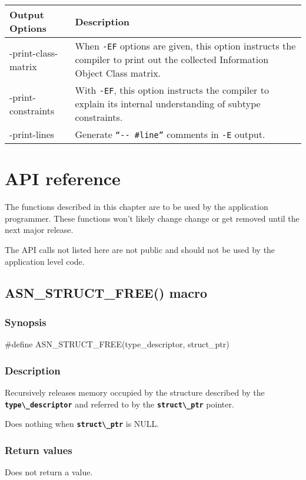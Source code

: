 \documentclass[english,oneside,12pt]{book}
\newcommand{\apisection}[2]{\clearpage\section{\label{#1}#2}}
\newcommand{\code}[1]{\texttt{\textbf{\lstinline{#1}}}}
\begin{document}
\begin{longtable}{lp{4in}}
\textbf{Output Options} & \textbf{Description}\\
\midrule
{\ttfamily -print-class-matrix} & {\small When \texttt{-EF} options are given, this option instructs the compiler to print out the collected Information Object Class matrix.}\\
{\ttfamily -print-constraints} & {\small With \texttt{-EF}, this option instructs the compiler
to explain its internal understanding of subtype constraints.}\\
{\ttfamily -print-lines} & {\small Generate \texttt{``-{}- \#line''} comments
in \texttt{-E} output.}\\
\end{longtable}
\renewcommand{\arraystretch}{1}


\chapter{API reference}

The functions described in this chapter are to be used by the application
programmer. These functions won't likely change change or get removed until
the next major release.

The API calls not listed here are not public and should not be used by the
application level code.

\apisection{sec:ASN_STRUCT_FREE}{ASN\_STRUCT\_FREE() macro}

\subsection*{Synopsis}

\begin{signature}
#define ASN_STRUCT_FREE(type_descriptor, struct_ptr)
\end{signature}

\subsection*{Description}

Recursively releases memory occupied by the structure
described by the \code{type\_descriptor} and referred to
by the \code{struct\_ptr} pointer.

Does nothing when \code{struct\_ptr} is NULL.

\subsection*{Return values}
Does not return a value.
\end{document}
